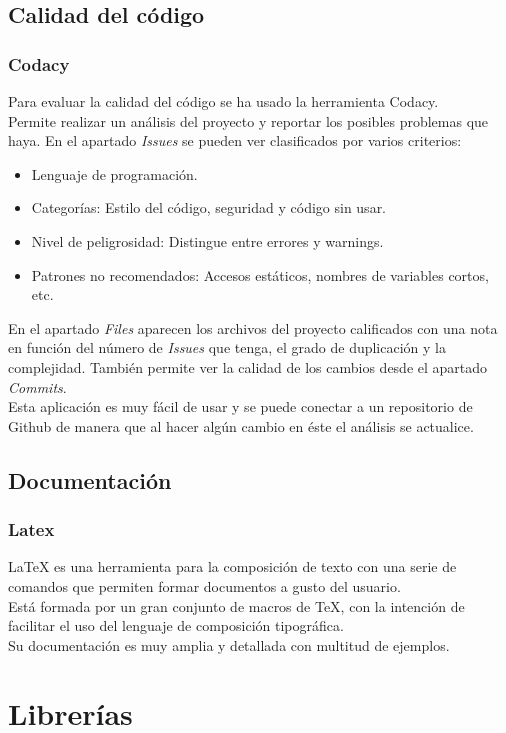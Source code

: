\subsection{Calidad del código}
\subsubsection{Codacy}
Para evaluar la calidad del código se ha usado la herramienta Codacy.\\
Permite realizar un análisis del proyecto y reportar los posibles problemas que haya. En el apartado \textit{Issues} se pueden ver clasificados por varios criterios: 
\begin{itemize}
    \item Lenguaje de programación.
    \item Categorías: Estilo del código, seguridad y código sin usar.
    \item Nivel de peligrosidad: Distingue entre errores y warnings.
    \item Patrones no recomendados: Accesos estáticos, nombres de variables cortos, etc.
\end{itemize}
En el apartado \textit{Files} aparecen los archivos del proyecto calificados con una nota en función del número de \textit{Issues} que tenga, el grado de duplicación y la complejidad.
También permite ver la calidad de los cambios desde el apartado \textit{Commits}.\\
Esta aplicación es muy fácil de usar y se puede conectar a un repositorio de Github de manera que al hacer algún cambio en éste el análisis se actualice.\\
\subsection{Documentación}
\subsubsection{Latex}
\LaTeX{} es una herramienta para la composición de texto con una serie de comandos que permiten formar documentos a gusto del usuario.\\
Está formada por un gran conjunto de macros de TeX, con la intención de facilitar el uso del lenguaje de composición tipográfica.\cite{wiki:latex}\\
Su documentación es muy amplia y detallada con multitud de ejemplos.
\section{Librerías}
